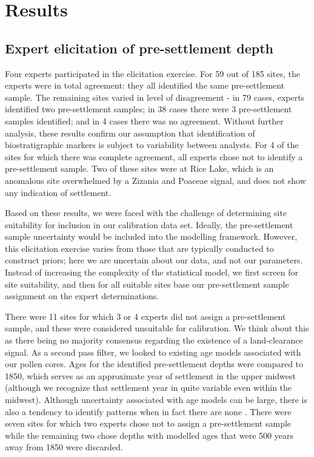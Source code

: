 \documentclass[12pt]{article}
\begin{document}
\section{Results}

\subsection{Expert elicitation of pre-settlement depth}

Four experts participated in the elicitation exercise. For 59 out of
185 sites, the experts were in total agreement: they all identified
the same pre-settlement sample. The remaining sites varied in level of
disagreement - in 79 cases, experts identified two pre-settlement
samples; in 38 cases there were 3 pre-settlement samples identified;
and in 4 cases there was no agreement. Without further analysis, these
results confirm our assumption that identification of biostratigraphic
markers is subject to variability between analysts. For 4 of the sites
for which there was complete agreement, all experts chose not to
identify a pre-settlement sample. Two of these sites were at Rice
Lake, which is an anomalous site overwhelmed by a Zizania and Poaceae
signal, and does not show any indication of settlement.

Based on these results, we were faced with the challenge of
determining site suitability for inclusion in our calibration data
set. Ideally, the pre-settlement sample uncertainty would be included
into the modelling framework. However, this elicitation exercise
varies from those that are typically conducted to construct priors;
here we are uncertain about our data, and not our parameters. Instead
of increasing the complexity of the statistical model, we first screen
for site suitability, and then for all suitable sites base our
pre-settlement sample assignment on the expert determinations.

There were 11 sites for which 3 or 4 experts did not assign a
pre-settlement sample, and these were considered unsuitable for
calibration. We think about this as there being no majority consensus
regarding the existence of a land-clearance signal. As a second pass
filter, we looked to existing age models associated with our pollen
cores. Ages for the identified pre-settlement depths were compared to
1850, which serves as an approximate year of settlement in the upper
midwest (although we recognize that settlement year in quite variable
even within the midwest).  Although uncertainty associated with age
models can be large, there is also a tendency to identify patterns
when in fact there are none \cite{XXX}. There were seven sites for
which two experts chose not to assign a pre-settlement sample while
the remaining two chose depths with modelled ages that were 500 years
away from 1850 were discarded.
\end{document}
